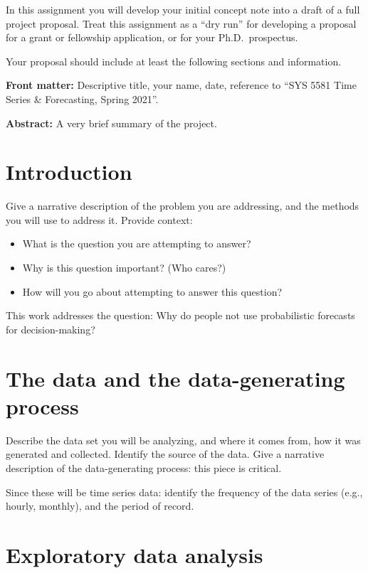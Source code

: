 \documentclass[
]{book}
\providecommand{\tightlist}{%
  \setlength{\itemsep}{0pt}\setlength{\parskip}{0pt}}
\begin{document}
In this assignment you will develop your initial concept note into a draft of a full project proposal. Treat this assignment as a ``dry run'' for developing a proposal for a grant or fellowship application, or for your Ph.D.~prospectus.

Your proposal should include at least the following sections and information.

\textbf{Front matter:} Descriptive title, your name, date, reference to ``SYS 5581 Time Series \& Forecasting, Spring 2021''.

\textbf{Abstract:} A very brief summary of the project.

\hypertarget{introduction}{%
\section{Introduction}\label{introduction}}

Give a narrative description of the problem you are addressing, and the methods you will use to address it. Provide context:

\begin{itemize}
\tightlist
\item
  What is the question you are attempting to answer?
\item
  Why is this question important? (Who cares?)
\item
  How will you go about attempting to answer this question?
\end{itemize}

This work addresses the question: Why do people not use probabilistic forecasts for decision-making?

\hypertarget{the-data-and-the-data-generating-process}{%
\section{The data and the data-generating process}\label{the-data-and-the-data-generating-process}}

Describe the data set you will be analyzing, and where it comes from, how it was generated and collected. Identify the source of the data. Give a narrative description of the data-generating process: this piece is critical.

Since these will be time series data: identify the frequency of the data series (e.g., hourly, monthly), and the period of record.

\hypertarget{exploratory-data-analysis}{%
\section{Exploratory data analysis}\label{exploratory-data-analysis}}
\end{document}
